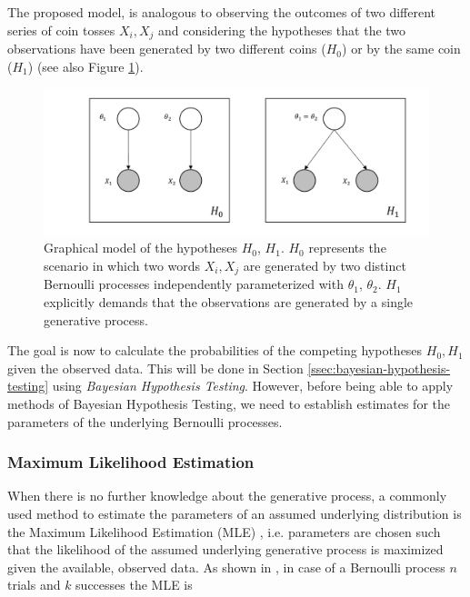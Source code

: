 The proposed model, is analogous to observing the outcomes of two different
series of coin tosses $X_i, X_j$ and considering the hypotheses that the two observations 
have been generated by two different coins ($H_0$) or by the same coin
($H_1$) (see also Figure \ref{fig:hypotheses}). 

\begin{figure}[htp]
\begin{center}
  \includegraphics[scale=0.7]{img/h1h2}
  \caption[Probabilistic modeling of word merging]{Graphical model of the
  hypotheses $H_0$, $H_1$. $H_0$ represents the scenario in which two words
  $X_i, X_j$ are generated by two distinct Bernoulli processes independently
  parameterized with $\theta_1$, $\theta_2$. $H_1$ explicitly demands that the
  observations are generated by a single generative process.}
  \label{fig:hypotheses}
\end{center}
\end{figure} 

The goal is now to calculate the probabilities
of the competing hypotheses $H_0, H_1$ given the observed data. This will be
done in Section \ref{ssec:bayesian-hypothesis-testing} using \emph{Bayesian
Hypothesis Testing}.
However, before being able to apply methods of Bayesian Hypothesis Testing, we
need to establish estimates for the parameters of the underlying 
Bernoulli processes.

\subsubsection{Maximum Likelihood Estimation}
\label{ssec:mle}
When there is no further knowledge about the generative process, a commonly used
method to estimate the parameters of an assumed underlying distribution 
is the Maximum Likelihood Estimation (MLE) \cite{casellar}, i.e. parameters are
chosen such that the likelihood of the assumed underlying generative process
is maximized given the available, observed data. As shown in
\cite{myung2003tutorial}, in case of a Bernoulli process $n$ trials and $k$
successes the MLE is


